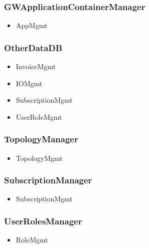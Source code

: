 {{{    \subsubsection{GWApplicationContainerManager}
        \begin{itemize}
            \item AppMgmt
        \end{itemize}

    \subsubsection{OtherDataDB}
        \begin{itemize}
            \item InvoiceMgmt
            \item IOMgmt
            \item SubscriptionMgmt
            \item UserRoleMgmt
        \end{itemize}

    \subsubsection{TopologyManager}
        \begin{itemize}
            \item TopologyMgmt
        \end{itemize}

    \subsubsection{SubscriptionManager}
        \begin{itemize}
            \item SubscriptionMgmt
        \end{itemize}

    \subsubsection{UserRolesManager}
        \begin{itemize}
            \item RoleMgmt
        \end{itemize}


}}}
